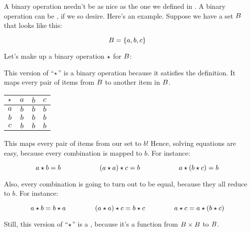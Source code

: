 \documentclass[../../../main.tex]{subfiles}
\begin{document}
\begin{fexample}
\label{ex:a-made-up-binary-operation}

A binary operation needn't be as nice as the one we defined in . A binary operation can be , if we so desire. Here's an example. Suppose we have a set $B$ that looks like this:

\begin{equation*}
  B = \{ a, b, c \}
\end{equation*}

Let's make up a binary operation $\opSymbol/$ for $B$:

\begin{aside}
  \begin{remark}
    This version of ``$\opSymbol/$'' is a binary operation because it satisfies the definition. It maps every pair of items from $B$ to another item in $B$.
  \end{remark}
\end{aside}

\begin{center}
  \begin{tabular}{| c || c | c | c | }
    \hline
    $\opSymbol/$ & $a$ & $b$ & $c$ \\ \hline \hline
    $a$          & $b$ & $b$ & $b$ \\ \hline
    $b$          & $b$ & $b$ & $b$ \\ \hline
    $c$          & $b$ & $b$ & $b$ \\ \hline
  \end{tabular}
\end{center}

This maps every pair of items from our set to $b$! Hence, solving equations are easy, because every combination is mapped to $b$. For instance:

\begin{equation*}
  \op{a}{b} = b \hskip 2cm 
  \op{(\op{a}{a})}{c} = b \hskip 2cm 
  \op{a}{(\op{b}{c})} = b
\end{equation*}

Also, every combination is going to turn out to be equal, because they all reduce to $b$. For instance:

\begin{equation*}
  \op{a}{b} = \op{b}{a} \hskip 1.5cm 
  \op{(\op{a}{a})}{c} = \op{b}{c} \hskip 1.5cm 
  \op{a}{c} = \op{a}{(\op{b}{c})}
\end{equation*}

Still, this version of ``$\opSymbol/$'' is a , because it's a function from $B \times B$ to $B$.

\end{fexample}
\end{document}
